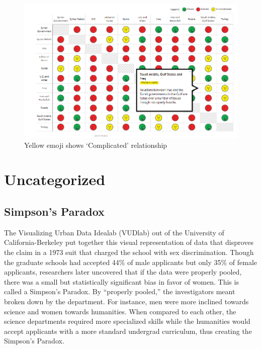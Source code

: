 \documentclass[]{book}
\theoremstyle{definition}
\theoremstyle{definition}
\theoremstyle{definition}
\theoremstyle{remark}
\begin{document}
\begin{figure}
\centering
\includegraphics{images/img_syria_complicated.PNG}
\caption{Yellow emoji shows `Complicated' relationship}
\end{figure}

\section{Uncategorized}\label{uncategorized}

\subsection{Simpson's Paradox}\label{simpsons-paradox}

The Visualizing Urban Data Idealab (VUDlab) out of the University of
California-Berkeley put together this visual representation of data that
disproves the claim in a 1973 suit that charged the school with sex
discrimination. Though the graduate schools had accepted 44\% of male
applicants but only 35\% of female applicants, researchers later
uncovered that if the data were properly pooled, there was a small but
statistically significant bias in favor of women. This is called a
Simpson's Paradox. By ``properly pooled,'' the investigators meant
broken down by the department. For instance, men were more inclined
towards science and women towards humanities. When compared to each
other, the science departments required more specialized skills while
the humanities would accept applicants with a more standard undergrad
curriculum, thus creating the Simpson's Paradox.
\end{document}
